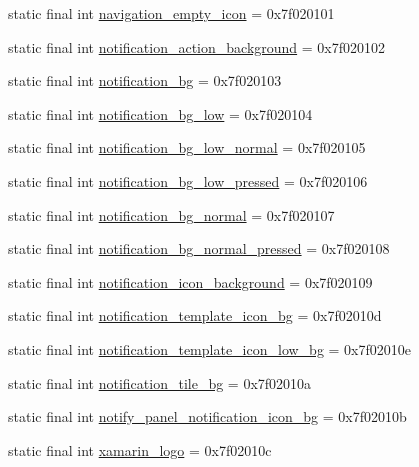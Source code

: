 \begin{CompactItemize}
static final int \hyperlink{classandroid_1_1support_1_1v7_1_1appcompat_1_1_r_1_1drawable_6df206e20cc218834740f2264834a382}{navigation\_\-empty\_\-icon} = 0x7f020101
\item 
static final int \hyperlink{classandroid_1_1support_1_1v7_1_1appcompat_1_1_r_1_1drawable_465d953b39ed2bf6ce9b2dc763ef8c30}{notification\_\-action\_\-background} = 0x7f020102
\item 
static final int \hyperlink{classandroid_1_1support_1_1v7_1_1appcompat_1_1_r_1_1drawable_aa9b0a3111366fbdc7374057c3c3c6c2}{notification\_\-bg} = 0x7f020103
\item 
static final int \hyperlink{classandroid_1_1support_1_1v7_1_1appcompat_1_1_r_1_1drawable_aa9ab3fccbf8bbe39c95a90ad1d043fe}{notification\_\-bg\_\-low} = 0x7f020104
\item 
static final int \hyperlink{classandroid_1_1support_1_1v7_1_1appcompat_1_1_r_1_1drawable_af827c4ab906d251887d4bd326bbc6a5}{notification\_\-bg\_\-low\_\-normal} = 0x7f020105
\item 
static final int \hyperlink{classandroid_1_1support_1_1v7_1_1appcompat_1_1_r_1_1drawable_671687c54cc61f7f97b014a851445a8e}{notification\_\-bg\_\-low\_\-pressed} = 0x7f020106
\item 
static final int \hyperlink{classandroid_1_1support_1_1v7_1_1appcompat_1_1_r_1_1drawable_23f4b279c35f9bd8a20783459fe2a785}{notification\_\-bg\_\-normal} = 0x7f020107
\item 
static final int \hyperlink{classandroid_1_1support_1_1v7_1_1appcompat_1_1_r_1_1drawable_d184567b93c94d7087476144781d0bf9}{notification\_\-bg\_\-normal\_\-pressed} = 0x7f020108
\item 
static final int \hyperlink{classandroid_1_1support_1_1v7_1_1appcompat_1_1_r_1_1drawable_19098d60b83dd866945dea6bfff6bb9f}{notification\_\-icon\_\-background} = 0x7f020109
\item 
static final int \hyperlink{classandroid_1_1support_1_1v7_1_1appcompat_1_1_r_1_1drawable_a611438f89fbd95a77f299f6662e7ca0}{notification\_\-template\_\-icon\_\-bg} = 0x7f02010d
\item 
static final int \hyperlink{classandroid_1_1support_1_1v7_1_1appcompat_1_1_r_1_1drawable_8a99b611ca9686420a5a35d275f9baa1}{notification\_\-template\_\-icon\_\-low\_\-bg} = 0x7f02010e
\item 
static final int \hyperlink{classandroid_1_1support_1_1v7_1_1appcompat_1_1_r_1_1drawable_d347cd2d891fbb3cda3382a4c85d183c}{notification\_\-tile\_\-bg} = 0x7f02010a
\item 
static final int \hyperlink{classandroid_1_1support_1_1v7_1_1appcompat_1_1_r_1_1drawable_5b83e29290a56926030fccee04e7cb71}{notify\_\-panel\_\-notification\_\-icon\_\-bg} = 0x7f02010b
\item 
static final int \hyperlink{classandroid_1_1support_1_1v7_1_1appcompat_1_1_r_1_1drawable_569c73695a3171fc8427cb40cbd63b86}{xamarin\_\-logo} = 0x7f02010c
\end{CompactItemize}


